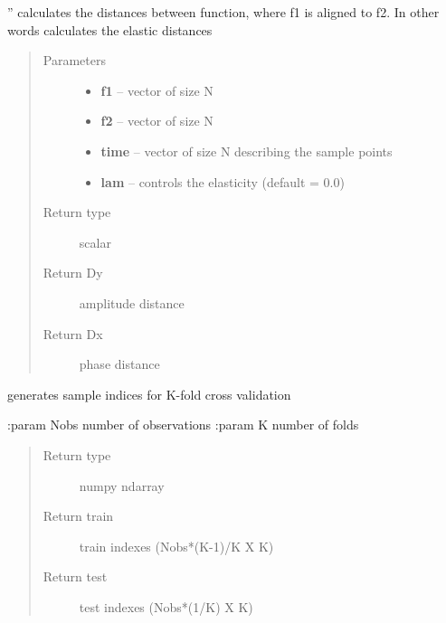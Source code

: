 \documentclass[letterpaper,10pt,english]{sphinxmanual}
\begin{document}

\begin{fulllineitems}
\label{utility_functions:utility_functions.elastic_distance}
''
calculates the distances between function, where f1 is aligned to
f2. In other words
calculates the elastic distances
\begin{quote}\begin{description}
\item[{Parameters}] \leavevmode\begin{itemize}
\item {} 
\textbf{f1} -- vector of size N

\item {} 
\textbf{f2} -- vector of size N

\item {} 
\textbf{time} -- vector of size N describing the sample points

\item {} 
\textbf{lam} -- controls the elasticity (default = 0.0)

\end{itemize}

\item[{Return type}] \leavevmode
scalar

\item[{Return Dy}] \leavevmode
amplitude distance

\item[{Return Dx}] \leavevmode
phase distance

\end{description}\end{quote}

\end{fulllineitems}


\begin{fulllineitems}
\label{utility_functions:utility_functions.f_K_fold}
generates sample indices for K-fold cross validation

:param Nobs number of observations
:param K number of folds
\begin{quote}\begin{description}
\item[{Return type}] \leavevmode
numpy ndarray

\item[{Return train}] \leavevmode
train indexes (Nobs*(K-1)/K X K)

\item[{Return test}] \leavevmode
test indexes (Nobs*(1/K) X K)

\end{description}\end{quote}

\end{fulllineitems}
\end{document}
